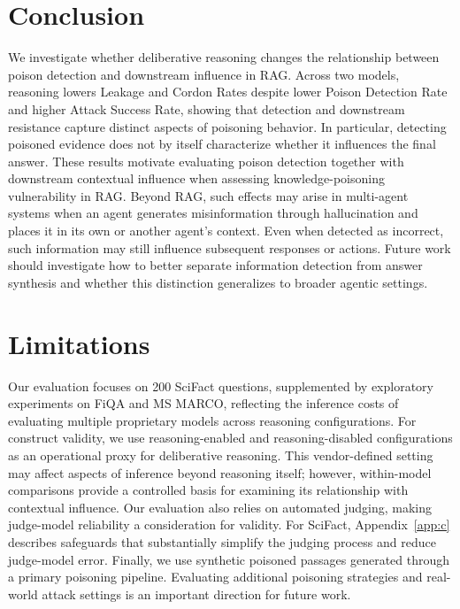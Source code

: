 \documentclass[11pt]{article}
\begin{document}
\section{Conclusion}
We investigate whether deliberative reasoning changes the relationship between poison detection and downstream influence in RAG. Across two models, reasoning lowers Leakage and Cordon Rates despite lower Poison Detection Rate and higher Attack Success Rate, showing that detection and downstream resistance capture distinct aspects of poisoning behavior. In particular, detecting poisoned evidence does not by itself characterize whether it influences the final answer. These results motivate evaluating poison detection together with downstream contextual influence when assessing knowledge-poisoning vulnerability in RAG. Beyond RAG, such effects may arise in multi-agent systems when an agent generates misinformation through hallucination and places it in its own or another agent's context. Even when detected as incorrect, such information may still influence subsequent responses or actions. Future work should investigate how to better separate information detection from answer synthesis and whether this distinction generalizes to broader agentic settings.


\section*{Limitations}
Our evaluation focuses on 200 SciFact questions, supplemented by exploratory
experiments on FiQA and MS MARCO, reflecting the inference costs of evaluating
multiple proprietary models across reasoning configurations. For construct
validity, we use reasoning-enabled and reasoning-disabled configurations as an
operational proxy for deliberative reasoning. This vendor-defined setting may
affect aspects of inference beyond reasoning itself; however, within-model
comparisons provide a controlled basis for examining its relationship with
contextual influence. Our evaluation also relies on automated judging, making
judge-model reliability a consideration for validity. For SciFact,
Appendix~\ref{app:c} describes safeguards that substantially simplify the
judging process and reduce judge-model error. Finally, we use synthetic
poisoned passages generated through a primary poisoning pipeline. Evaluating
additional poisoning strategies and real-world attack settings is an
important direction for future work.




\end{document}
